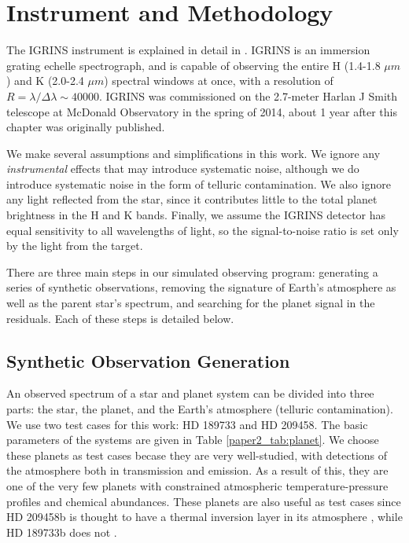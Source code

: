 \section{Instrument and Methodology}
\label{paper2_sec:method}
The IGRINS instrument is explained in detail in \cite{IGRINS}. IGRINS
is an immersion grating echelle spectrograph, and is capable of observing the entire H (1.4-1.8 $\mu m$) and K (2.0-2.4 $\mu m$) spectral windows at once,
with a resolution of $R=\lambda / \Delta \lambda \sim 40000$. IGRINS was commissioned on the 2.7-meter Harlan J Smith telescope at McDonald Observatory in the spring of 2014, about 1 year after this chapter was originally published.

We make several assumptions and simplifications in this work. We
ignore any \emph{instrumental} effects that may introduce systematic noise, although we do introduce systematic noise in the form of telluric contamination. We also ignore any light reflected from the star, since it contributes little to the total planet brightness in the H and K bands. Finally, we assume the IGRINS detector has equal sensitivity to all wavelengths of light, so the signal-to-noise ratio is set only by the light from the target.

There are three main steps in our simulated observing program: generating
a series of synthetic observations, removing the signature of Earth's
atmosphere as well as the parent star's spectrum, and searching for
the planet signal in the residuals. Each of these steps is detailed
below.

\subsection{Synthetic Observation Generation}
\label{paper2_sec:obsgen}
An observed spectrum of a star and planet system can be divided into
three parts: the star, the planet, and the Earth's atmosphere
(telluric contamination). We use two test cases for this work: HD 189733 and HD 209458. The basic parameters of the systems are given in Table \ref{paper2_tab:planet}. We choose these planets as test cases becase they are very well-studied, with detections of the atmosphere both in transmission and emission. As a result of this, they are one of the very few planets with constrained atmospheric temperature-pressure profiles and chemical abundances. These planets are also useful as test cases since HD 209458b is thought to have a thermal inversion layer in its atmosphere \citep{Knutson2008}, while HD 189733b does not \citep{Char2008}.

